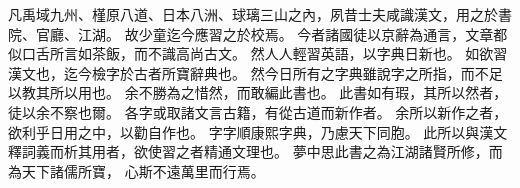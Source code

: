 凡禹域九州、槿原八道、日本八洲、球璃三山之內，夙昔士夫咸識漢文，用之於書院、官廳、江湖。
故少童迄今應習之於校焉。
今者諸國徒以京辭為通言，文章都似口舌所言如茶飯，而不識高尚古文。
然人人輕習英語，以字典日新也。
如欲習漢文也，迄今檢字於古者所寶辭典也。
然今日所有之字典雖說字之所指，而不足以教其所以用也。
余不勝為之惜然，而敢編此書也。
此書如有瑕，其所以然者，徒以余不察也爾。
各字或取諸文言古籍，有從古道而新作者。
余所以新作之者，欲利乎日用之中，以勸自作也。
字字順康熙字典，乃慮天下同胞。
此所以與漢文釋詞義而析其用者，欲使習之者精通文理也。
夢中思此書之為江湖諸賢所修，而為天下諸儒所寶，
心斯不遠萬里而行焉。
